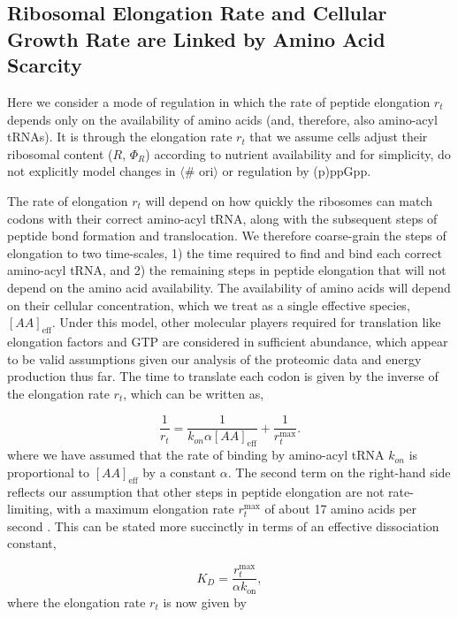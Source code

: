 \subsection{Ribosomal Elongation Rate and Cellular Growth Rate are Linked by
Amino Acid Scarcity}
Here we consider a mode of regulation in which the rate of peptide elongation
$r_t$ depends only on the availability of amino acids (and, therefore, also
amino-acyl tRNAs). It is through the elongation rate $r_t$ that we assume cells
adjust their ribosomal content ($R$, $\Phi_R$) according to nutrient
availability and for simplicity, do not explicitly model changes in  $\langle$\#
ori$\rangle$ or regulation by (p)ppGpp.

The rate of elongation $r_t$ will depend on how quickly the ribosomes can match
codons with their correct amino-acyl tRNA, along with the subsequent steps of
peptide bond formation and translocation. We therefore coarse-grain the steps of
elongation to two time-scales,  1) the time required to find and bind each
correct amino-acyl tRNA, and 2) the remaining steps in peptide elongation that
will not depend on the amino acid availability. The availability of amino acids
will depend on their cellular concentration, which we treat as a single
effective species, $[AA]_\text{eff}$. Under this model, other molecular players
required for translation like elongation factors and GTP are considered in
sufficient abundance, which appear to be valid assumptions given our analysis of
the proteomic data and energy production thus far. The time to translate each
codon is given by the inverse of the elongation rate $r_t$, which can be written
as,

\begin{equation}
\frac{1}{r_t} = \frac{1}{k_{on} \alpha [AA]_{\text{eff}}} + \frac{1}{r_{t}^{\text{max}}}.
\end{equation}
where we have assumed that the rate of binding by amino-acyl tRNA $k_{on}$ is
proportional to $[AA]_{\text{eff}}$ by a constant $\alpha$. The second term on the
right-hand side reflects our assumption that other steps in peptide elongation
are not rate-limiting, with a maximum elongation rate $r_{t}^{\text{max}}$ of
about 17 amino acids per second \cite{dai2016}. This can be stated more succinctly in
terms of an effective dissociation constant,

\begin{equation}
    K_D = \frac{r_{t}^{\text{max}}}{\alpha k_\text{on}},
\end{equation}
where the elongation rate $r_t$ is now given by

